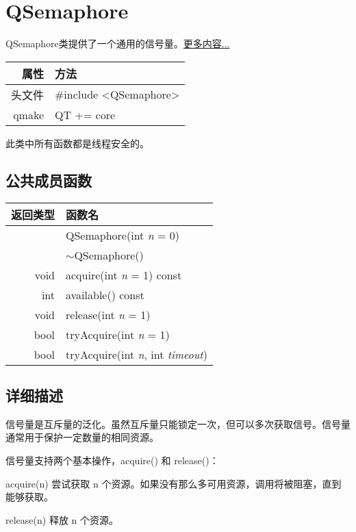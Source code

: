 \chapter{QSemaphore}

QSemaphore类提供了一个通用的信号量。\href{}{更多内容...}

\begin{tabular}{|r|l|}
	\hline
	属性 & 方法 \\
	\hline
	头文件 & \#include <QSemaphore>\\      
	\hline
	qmake & QT += core\\      
	\hline
\end{tabular}

\begin{warning}
此类中所有函数都是线程安全的。
\end{warning}

\section{公共成员函数}

\begin{tabular}{|r|l|}
	\hline 
	返回类型	& 函数名 \\ 
	\hline 
	& QSemaphore(int \emph{n} = 0) \\ 
	\hline
	& $\sim$QSemaphore() \\
	\hline
	void	& acquire(int \emph{n} = 1) const \\ 
	\hline
	int	& available() const \\ 
	\hline
	void &	release(int \emph{n} = 1) \\
	\hline
	bool &	tryAcquire(int \emph{n} = 1) \\ 
	\hline 
	bool	&tryAcquire(int \emph{n}, int \emph{timeout}) \\ 
	\hline
\end{tabular}


\section{详细描述}

信号量是互斥量的泛化。虽然互斥量只能锁定一次，但可以多次获取信号。信号量通常用于保护一定数量的相同资源。

信号量支持两个基本操作，acquire() 和 release()：

\begin{compactitem}
\item acquire(n) 尝试获取 n 个资源。如果没有那么多可用资源，调用将被阻塞，直到能够获取。
\item release(n) 释放 n 个资源。
\end{compactitem}

